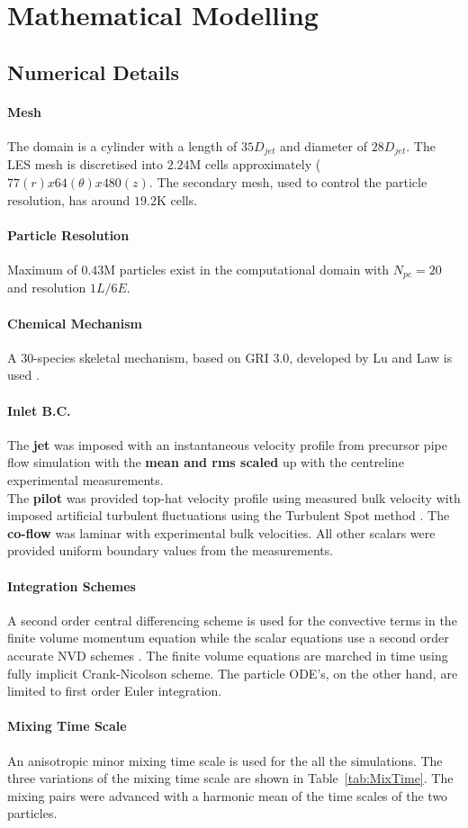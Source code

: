 \section{Mathematical Modelling}
\label{mathModel}

\subsection{Numerical Details}
\paragraph{Mesh} The domain is a cylinder with a length of $35D_{jet}$ and diameter of $28D_{jet}$. The LES mesh is discretised into $2.24$M cells approximately ($77(r)x64(\theta)x480(z)$.
The secondary mesh, used to control the particle resolution, has around $19.2$K cells.

\paragraph{Particle Resolution} Maximum of $0.43$M particles exist in  the computational domain with $N_{pc}=20$ and resolution $1L/6E$.

\paragraph{Chemical Mechanism} A $30$-species skeletal mechanism, based on GRI 3.0, developed by Lu and Law is used \cite{Lu2008}.

\paragraph{Inlet B.C.} The \textbf{jet} was imposed with an instantaneous velocity profile from precursor pipe flow simulation with the \textbf{mean and rms scaled} up with the centreline experimental measurements. \\
The \textbf{pilot} was provided top-hat velocity profile using measured bulk velocity with imposed artificial turbulent fluctuations using the Turbulent Spot method \cite{Kroger2018}. The \textbf{co-flow} was laminar with experimental bulk velocities. All other scalars were provided uniform boundary values from the measurements.

\paragraph{Integration Schemes} A second order central differencing scheme is used for the convective terms in the finite volume momentum equation while the scalar equations use a second order accurate NVD schemes \cite{Jasak1996}. The finite volume equations are marched in time using fully implicit Crank-Nicolson scheme. The particle ODE's, on the other hand, are limited to first order Euler integration.

\paragraph{Mixing Time Scale} An anisotropic minor mixing time scale \cite{Vo2017a} is used for the all the simulations. The three variations of the mixing time scale are shown in Table~\vref{tab:MixTime}. The mixing pairs were advanced with a harmonic mean of the time scales of the two particles.
